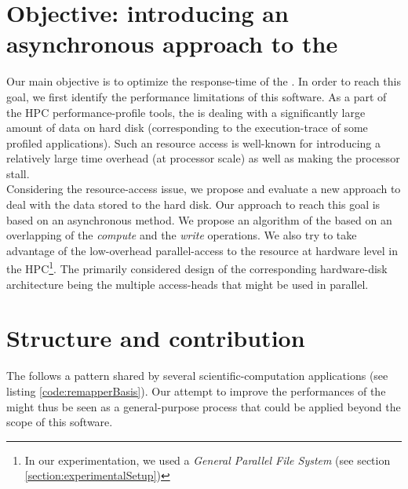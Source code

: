 \section{Objective: introducing an asynchronous \notationIO\space approach to the \toolTargetSoftware} \label{section:introductionObjective}
	Our main objective is to optimize the response-time of the \toolTargetSoftware.   In order to reach this goal, we first identify the performance limitations of this software.   As a part of the HPC performance-profile tools, the \toolTargetSoftware\space is dealing with a significantly large amount of data on hard disk (corresponding to the execution-trace of some profiled applications).   Such an \notationIO\space resource access is well-known for introducing a relatively large time overhead (at processor scale) as well as making the processor stall.\\

	Considering the \notationIO\space resource-access issue, we propose and evaluate a new approach to deal with the data stored to the hard disk.   Our approach to reach this goal is based on an asynchronous \notationIO\space method.  We propose an algorithm of the \toolTargetSoftware\space based on an overlapping of the \emph{compute} and the \notationIO\space \emph{write} operations.   We also try to take advantage of the low-overhead parallel-access to the \notationIO\space resource at hardware level in the HPC\footnote{In our experimentation, we used a \emph{General Parallel File System} (see section \ref{section:experimentalSetup})}.   The primarily considered design of the corresponding hardware-disk architecture being the multiple access-heads that might be used in parallel.\\


\section{Structure and contribution}
	The \toolTargetSoftware\space follows a pattern shared by several scientific-computation applications (see listing \ref{code:remapperBasis}).   Our attempt to improve the performances of the \toolTargetSoftware\space might thus be seen as a general-purpose process that could be applied beyond the scope of this software.\\

